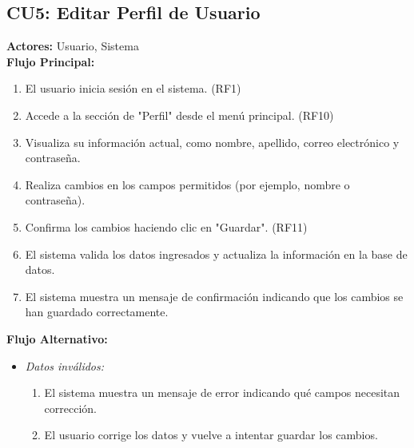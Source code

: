 \subsection*{CU5: Editar Perfil de Usuario}
\textbf{Actores:} Usuario, Sistema\\
\textbf{Flujo Principal:}
\begin{enumerate}
    \item El usuario inicia sesión en el sistema. (RF1)
    \item Accede a la sección de "Perfil" desde el menú principal. (RF10)
    \item Visualiza su información actual, como nombre, apellido, correo electrónico y contraseña.
    \item Realiza cambios en los campos permitidos (por ejemplo, nombre o contraseña).
    \item Confirma los cambios haciendo clic en "Guardar". (RF11)
    \item El sistema valida los datos ingresados y actualiza la información en la base de datos.
    \item El sistema muestra un mensaje de confirmación indicando que los cambios se han guardado correctamente.
\end{enumerate}
\textbf{Flujo Alternativo:}
\begin{itemize}
    \item \textit{Datos inválidos:}
    \begin{enumerate}
        \item El sistema muestra un mensaje de error indicando qué campos necesitan corrección.
        \item El usuario corrige los datos y vuelve a intentar guardar los cambios.
    \end{enumerate}
\end{itemize}